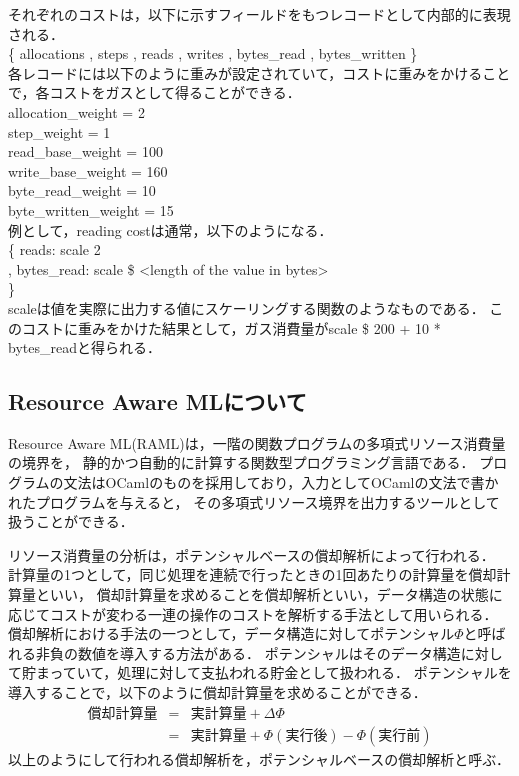 \documentclass{kuisthesis}
\begin{document}
それぞれのコストは，以下に示すフィールドをもつレコードとして内部的に表現される．\\
\hspace{15pt}\{ allocations 
, steps 
, reads 
, writes 
, bytes\_read 
, bytes\_written 
\} \\
各レコードには以下のように重みが設定されていて，コストに重みをかけることで，各コストをガスとして得ることができる．\\
\hspace{15pt} allocation\_weight = 2 \\
\hspace{15pt} step\_weight = 1 \\
\hspace{15pt} read\_base\_weight = 100 \\
\hspace{15pt} write\_base\_weight = 160 \\
\hspace{15pt} byte\_read\_weight = 10 \\
\hspace{15pt} byte\_written\_weight = 15 \\
例として，reading costは通常，以下のようになる． \\
\hspace{15pt} \{ reads: scale 2 \\
\hspace{15pt} , bytes\_read: scale \$ <length of the value in bytes> \\
\hspace{15pt} \} \\
scaleは値を実際に出力する値にスケーリングする関数のようなものである．
このコストに重みをかけた結果として，ガス消費量がscale \$ 200 + 10 * bytes\_readと得られる．




\subsection{Resource Aware MLについて}\label{subsec-pre-raml}
Resource Aware ML(RAML)は，一階の関数プログラムの多項式リソース消費量の境界を，
静的かつ自動的に計算する関数型プログラミング言語である．
プログラムの文法はOCamlのものを採用しており，入力としてOCamlの文法で書かれたプログラムを与えると，
その多項式リソース境界を出力するツールとして扱うことができる．

リソース消費量の分析は，ポテンシャルベースの償却解析によって行われる．
計算量の1つとして，同じ処理を連続で行ったときの1回あたりの計算量を償却計算量といい，
償却計算量を求めることを償却解析といい，データ構造の状態に応じてコストが変わる一連の操作のコストを解析する手法として用いられる．
償却解析における手法の一つとして，データ構造に対してポテンシャル$\Phi$と呼ばれる非負の数値を導入する方法がある．
ポテンシャルはそのデータ構造に対して貯まっていて，処理に対して支払われる貯金として扱われる．
ポテンシャルを導入することで，以下のように償却計算量を求めることができる．
\begin{eqnarray*}
  \mbox{償却計算量}&=&\mbox{実計算量}+\Delta \Phi \\
  &=&\mbox{実計算量}+\Phi (\mbox{実行後})-\Phi(\mbox{実行前})
\end{eqnarray*}
以上のようにして行われる償却解析を，ポテンシャルベースの償却解析と呼ぶ．
\end{document}
